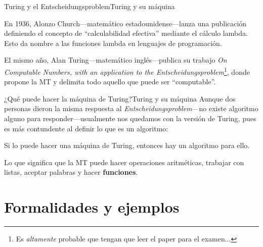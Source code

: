 \documentclass[spanish]{beamer}
\begin{document}
\begin{frame}{Turing y el Entscheidungsproblem}{Turing y su máquina}

    En 1936, Alonzo Church---matemático estadounidense---lanza una publicación definiendo el concepto de ``calculabilidad efectiva'' mediante el cálculo lambda. Esto da nombre a las funciones lambda en lenguajes de programación. \pause

    \bigskip

    El mismo año, Alan Turing---matemático inglés---publica su trabajo \textit{On Computable Numbers, with an application to the Entscheidungsproblem}\footnote{Es \textit{altamente} probable que tengan que leer el paper para el examen...}, donde propone la MT y delimita todo aquello que puede ser ``computable''. \pause
    
\end{frame}

\begin{frame}{¿Qué puede hacer la máquina de Turing?}{Turing y su máquina}
    Aunque dos personas dieron la misma respuesta al \textit{Entscheidungsproblem}---no existe algoritmo alguno para responder---usualmente nos quedamos con la versión de Turing, pues es más contundente al definir lo que es un algoritmo: \pause

    \bigskip

    \begin{theorem}
        Si lo puede hacer una máquina de Turing, entonces hay un algoritmo para ello.
    \end{theorem} \pause

    \bigskip

    Lo que significa que la MT puede hacer operaciones aritméticas, trabajar con listas, aceptar palabras y hacer \textbf{funciones}. \pause

\end{frame}

\section{Formalidades y ejemplos}
\end{document}

